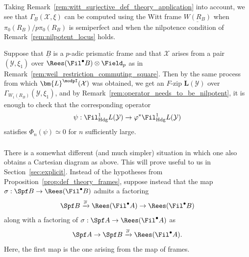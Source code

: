 \documentclass[10pt]{amsart}
\begin{document}
\begin{remark}
\label{rem:nilpotent_locus_witt}
Taking Remark~\ref{rem:witt_surjective_def_theory_application} into account, we see that $\Gamma_{\underline{B}}(\mathcal{X},\xi)$ can be computed using the Witt frame $\underline{W(R_B)}$ when $\pi_0(R_B)/p\pi_0(R_B)$ is semiperfect and when the nilpotence condition of Remark~\ref{rem:nilpotent_locus} holds.
\end{remark}   


\begin{remark}
\label{rem:nilpotent_locus_p-adic}
Suppose that $\underline{B}$ is a $p$-adic prismatic frame and that $\mathcal{X}$ arises from a pair $(\mathcal{Y},\xi_1)$ over $\Rees(\Fil^\bullet B)\otimes\Field_p$ as in Remark~\ref{rem:weil_restriction_commuting_square}. Then by the same process from which $\bm{L}^\modpI(\mathcal{X})$ was obtained, we get an $F$-zip $\bm{L}(\mathcal{Y})$ over $\Gamma_{\underline{W_1(R_B)}}(\mathcal{Y},\xi_1)$, and by Remark~\ref{rem:operator_needs_to_be_nilpotent}, it is enough to check that the corresponding operator 
\[
\psi:\Fil^1_{\mathrm{Hdg}}L(\mathcal{Y})\to \varphi^*\Fil^1_{\mathrm{Hdg}}L(\mathcal{Y})
\]
satisfies $\Phi_n(\psi) \simeq 0$ for $n$ sufficiently large.
\end{remark}   



\subsubsection{}
There is a somewhat different (and much simpler) situation in which one also obtains a Cartesian diagram as above.  This will prove useful to us in Section~\ref{sec:explicit}. Instead of the hypotheses from Proposition~\ref{prop:def_theory_frames}, suppose instead that the map $\sigma:\Spf B\to \Rees(\Fil^\bullet B)$ admits a factoring
\[
\Spf B\xrightarrow{\overline{\sigma}}\Rees(\Fil^\bullet A)\to \Rees(\Fil^\bullet B)
\]
along with a factoring of $\sigma:\Spf A\to \Rees(\Fil^\bullet A)$ as
\[
\Spf A \to \Spf B \xrightarrow{\overline{\sigma}}\Rees(\Fil^\bullet A).
\]
Here, the first map is the one arising from the map of frames.
\end{document}
